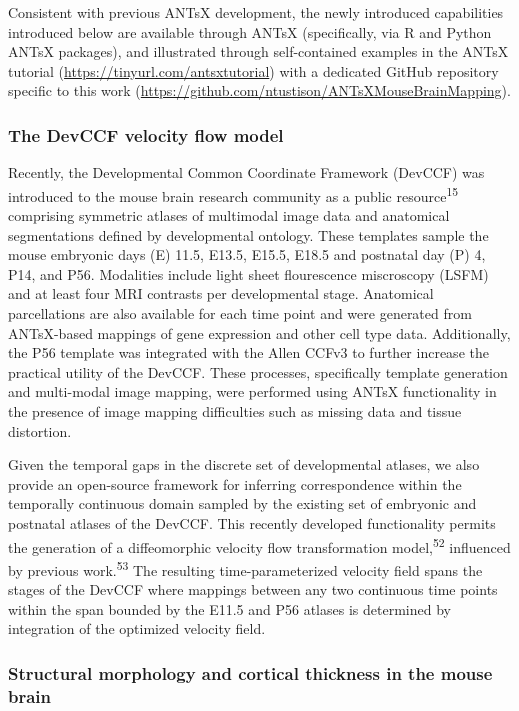 \documentclass[
  12pt,
]{article}
\begin{document}
Consistent with previous ANTsX development, the newly introduced
capabilities introduced below are available through ANTsX (specifically,
via R and Python ANTsX packages), and illustrated through self-contained
examples in the ANTsX tutorial (\url{https://tinyurl.com/antsxtutorial})
with a dedicated GitHub repository specific to this work
(\url{https://github.com/ntustison/ANTsXMouseBrainMapping}).

\hypertarget{the-devccf-velocity-flow-model}{%
\subsubsection{The DevCCF velocity flow
model}\label{the-devccf-velocity-flow-model}}

Recently, the Developmental Common Coordinate Framework (DevCCF) was
introduced to the mouse brain research community as a public
resource\textsuperscript{15} comprising symmetric atlases of multimodal
image data and anatomical segmentations defined by developmental
ontology. These templates sample the mouse embryonic days (E) 11.5,
E13.5, E15.5, E18.5 and postnatal day (P) 4, P14, and P56. Modalities
include light sheet flourescence miscroscopy (LSFM) and at least four
MRI contrasts per developmental stage. Anatomical parcellations are also
available for each time point and were generated from ANTsX-based
mappings of gene expression and other cell type data. Additionally, the
P56 template was integrated with the Allen CCFv3 to further increase the
practical utility of the DevCCF. These processes, specifically template
generation and multi-modal image mapping, were performed using ANTsX
functionality in the presence of image mapping difficulties such as
missing data and tissue distortion.

Given the temporal gaps in the discrete set of developmental atlases, we
also provide an open-source framework for inferring correspondence
within the temporally continuous domain sampled by the existing set of
embryonic and postnatal atlases of the DevCCF. This recently developed
functionality permits the generation of a diffeomorphic velocity flow
transformation model,\textsuperscript{52} influenced by previous
work.\textsuperscript{53} The resulting time-parameterized velocity
field spans the stages of the DevCCF where mappings between any two
continuous time points within the span bounded by the E11.5 and P56
atlases is determined by integration of the optimized velocity field.

\hypertarget{structural-morphology-and-cortical-thickness-in-the-mouse-brain}{%
\subsubsection{Structural morphology and cortical thickness in the mouse
brain}\label{structural-morphology-and-cortical-thickness-in-the-mouse-brain}}
\end{document}
